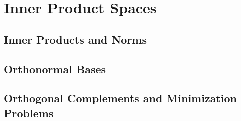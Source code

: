 \chapter{Inner Product Spaces}

\section{Inner Products and Norms}

\section{Orthonormal Bases}

\section{Orthogonal Complements and Minimization Problems}

